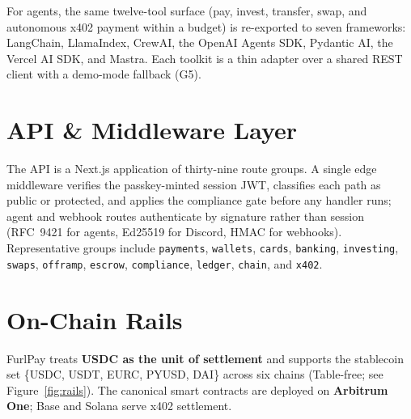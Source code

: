 \documentclass[10pt,twocolumn]{article}
\begin{document}
For agents, the same twelve-tool surface (pay, invest, transfer, swap, and
autonomous x402 payment within a budget) is re-exported to seven frameworks:
LangChain, LlamaIndex, CrewAI, the OpenAI Agents SDK, Pydantic AI, the Vercel AI
SDK, and Mastra. Each toolkit is a thin adapter over a shared REST client with a
demo-mode fallback (G5).

\section{API \& Middleware Layer}\label{sec:api}
The API is a Next.js application of thirty-nine route groups. A single edge
middleware verifies the passkey-minted session JWT, classifies each path as public
or protected, and applies the compliance gate before any handler runs; agent and
webhook routes authenticate by signature rather than session (RFC~9421 for agents,
Ed25519 for Discord, HMAC for webhooks). Representative groups include
\texttt{payments}, \texttt{wallets}, \texttt{cards}, \texttt{banking},
\texttt{investing}, \texttt{swaps}, \texttt{offramp}, \texttt{escrow},
\texttt{compliance}, \texttt{ledger}, \texttt{chain}, and \texttt{x402}.

\section{On-Chain Rails}\label{sec:chain}
FurlPay treats \textbf{USDC as the unit of settlement} and supports the stablecoin
set \{USDC, USDT, EURC, PYUSD, DAI\} across six chains
(Table-free; see Figure~\ref{fig:rails}). The canonical smart contracts are
deployed on \textbf{Arbitrum One}; Base and Solana serve x402 settlement.
\end{document}

